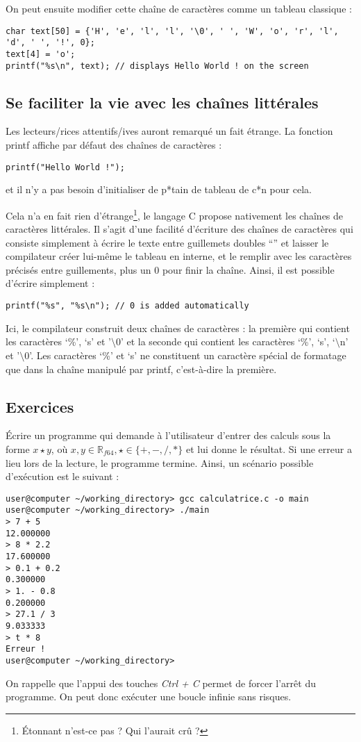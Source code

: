 \documentclass[../../../main.tex]{subfiles}
\begin{document}
On peut ensuite modifier cette chaîne de caractères comme un tableau classique :
\begin{verbatim}
char text[50] = {'H', 'e', 'l', 'l', '\0', ' ', 'W', 'o', 'r', 'l', 'd', ' ', '!', 0};
text[4] = 'o';
printf("%s\n", text); // displays Hello World ! on the screen
\end{verbatim}
\subsection{Se faciliter la vie avec les chaînes littérales}
Les lecteurs/rices attentifs/ives auront remarqué un fait étrange. La fonction \textsf{printf} affiche par défaut des chaînes de caractères :
\begin{verbatim}
printf("Hello World !");
\end{verbatim}
et il n'y a pas besoin d'initialiser de p*tain de tableau de c*n pour cela.
 
Cela n'a en fait rien d'étrange\footnote{Étonnant n'est-ce pas ? Qui l'aurait crû ?}, le langage C propose nativement les chaînes de caractères littérales. Il s'agit d'une facilité d'écriture des chaînes de caractères qui consiste simplement à écrire le texte entre guillemets doubles ``'' et laisser le compilateur créer lui-même le tableau en interne, et le remplir avec les caractères précisés entre guillements, plus un 0 pour finir la chaîne.\newline
Ainsi, il est possible d'écrire simplement :
\begin{verbatim}
printf("%s", "%s\n"); // 0 is added automatically
\end{verbatim}
Ici, le compilateur construit deux chaînes de caractères : la première qui contient les caractères `\%', `s' et '$\setminus{0}$' et la seconde qui contient les caractères `\%', `s', `$\setminus$n' et '$\setminus0$'. Les caractères `\%' et `s' ne constituent un caractère spécial de formatage que dans la chaîne manipulé par \textsf{printf}, c'est-à-dire la première.
\subsection{Exercices}
Écrire un programme qui demande à l'utilisateur d'entrer des calculs sous la forme $x\star y$, où $x, y\in{\mathbb{R}_{f64}}, \star\in\{+, -, /, *\}$ et lui donne le résultat. Si une erreur a lieu lors de la lecture, le programme termine. Ainsi, un scénario possible d'exécution est le suivant :
\begin{verbatim}
user@computer ~/working_directory> gcc calculatrice.c -o main
user@computer ~/working_directory> ./main
> 7 + 5
12.000000
> 8 * 2.2
17.600000
> 0.1 + 0.2
0.300000
> 1. - 0.8
0.200000
> 27.1 / 3
9.033333
> t * 8
Erreur !
user@computer ~/working_directory>
\end{verbatim}
On rappelle que l'appui des touches \textit{Ctrl + C} permet de forcer l'arrêt du programme. On peut donc exécuter une boucle infinie sans risques.
 
\end{document}
